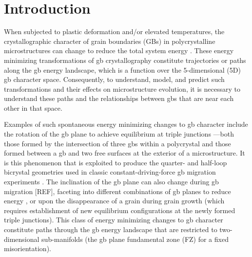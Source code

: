 \documentclass[final,twocolumn,12pt]{elsarticle}
\begin{document}
	
	\section{Introduction} \label{sec:intro}
	
	When subjected to plastic deformation and/or elevated temperatures, the crystallographic character of grain boundaries (GBs) in polycrystalline microstructures can change to reduce the total system energy \cite{bachurinGrainRotationDislocation2012,barrales-moraImpactGrainBoundary2014,harrisGRAINROTATIONTHIN,klingerShapeEvolutionSurface2011,upmanyuSimultaneousGrainBoundary2006a}. These energy minimizing transformations of \gls{gb} crystallography constitute trajectories or paths along the \gls{gb} energy landscape, which is a function over the 5-dimensional (5D) \gls{gb} character space. Consequently, to understand, model, and predict such transformations and their effects on microstructure evolution, it is necessary to understand these paths and the relationships between \glspl{gb} that are near each other in that space.
	
	Examples of such spontaneous energy minimizing changes to \gls{gb} character include the rotation of the \gls{gb} plane to achieve equilibrium at triple junctions \cite{Herring:1951tm,rowenhorstMeasurementsGrainBoundary2005a}---both those formed by the intersection of three \glspl{gb} within a polycrystal and those formed between a \gls{gb} and two free surfaces at the exterior of a microstructure. It is this phenomenon that is exploited to produce the quarter- and half-loop bicrystal geometries used in classic constant-driving-force \gls{gb} migration experiments \cite{brandenburgEffectInclinationDependence2013,furtkampGrainBoundaryMigration1998,gottsteinGrainBoundaryMigration,ivanovImpactBoundaryOrientation2004,molodovEffectPressureMigration1984,molodovMOBHJTYTILTGRAIN}. The inclination of the \gls{gb} plane can also change during \gls{gb} migration [REF], faceting into different combinations of \gls{gb} planes to reduce energy \cite{ramasubramaniamEvolutionFacetedGrainboundary2005}, or upon the disappearance of a grain during grain growth (which requires establishment of new equilibrium configurations at the newly formed triple junctions). This class of energy minimizing changes to \gls{gb} character constitute paths through the \gls{gb} energy landscape that are restricted to two-dimensional sub-manifolds (the \gls{gb} plane fundamental zone (FZ) for a fixed misorientation).
	
\end{document}
